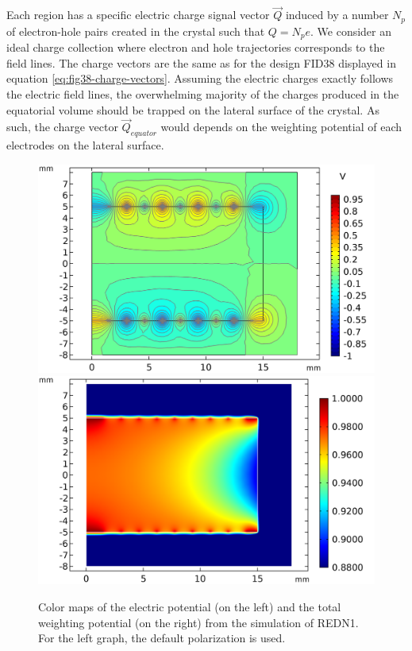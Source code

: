Each region has a specific electric charge signal vector $\vec{Q}$ induced by a number $N_p$ of electron-hole pairs created in the crystal such that $Q = N_p e$. We consider an ideal charge collection where electron and hole trajectories corresponds to the field lines. The charge vectors are the same as for the design FID38 displayed in equation \ref{eq:fig38-charge-vectors}.
Assuming the electric charges exactly follows the electric field lines, the overwhelming majority of the charges produced in the equatorial volume should be trapped on the lateral surface of the crystal. As such, the charge vector $\vec{Q}_{equator}$ would depends on the weighting potential of each electrodes on the lateral surface.

\begin{figure}
\centering
\includegraphics[scale=0.5]{Figures/ElectrodesExperimental/potential_redn1.png}
\includegraphics[scale=0.5]{Figures/ElectrodesExperimental/twp_redn1.png}
\caption{Color maps of the electric potential (on the left) and the total weighting potential (on the right) from the simulation of REDN1. For the left graph, the default polarization is used.}
\label{fig:redn1-potential-twp}
\end{figure}

